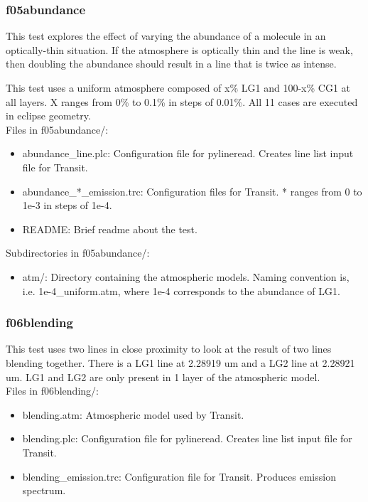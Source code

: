 \documentclass[letterpaper, 12pt]{article}
\begin{document}
\subsubsection{f05abundance}
\label{sec:abundance}
This test explores the effect of varying the abundance of a molecule in an 
optically-thin situation. If the atmosphere is optically thin and the line 
is weak, then doubling the abundance should result in a line that is twice as 
intense.

This test uses a uniform atmosphere composed of x\% LG1 and 100-x\% CG1 at 
all layers. X ranges from 0\% to 0.1\% in steps of 0.01\%. All 11 cases 
are executed in eclipse geometry.\\

Files in f05abundance/:
\begin{itemize} \itemsep0pt
  \item abundance{\_}line.plc: Configuration file for pylineread. Creates 
        line list input file for Transit.
  \item abundance{\_}*{\_}emission.trc: Configuration files for Transit. * 
        ranges from 0 to 1e-3 in steps of 1e-4.
  \item README: Brief readme about the test.
\end{itemize}

Subdirectories in f05abundance/:
\begin{itemize} \itemsep0pt
  \item atm/: Directory containing the atmospheric models. Naming convention 
        is, i.e. 1e-4{\_}uniform.atm, where 1e-4 corresponds to the abundance 
of LG1.
\end{itemize}

\subsubsection{f06blending}
\label{sec:blending}
This test uses two lines in close proximity to look at the 
result of two lines blending together. There is a LG1 line at 2.28919 um 
and a LG2 line at 2.28921 um. LG1 and LG2 are only present in 1 layer of 
the atmospheric model.\\

Files in f06blending/:
\begin{itemize} \itemsep0pt
  \item blending.atm: Atmospheric model used by Transit.
  \item blending.plc: Configuration file for pylineread. Creates 
        line list input file for Transit.
  \item blending{\_}emission.trc: Configuration file for Transit. Produces 
        emission spectrum.
\end{itemize}
\end{document}
